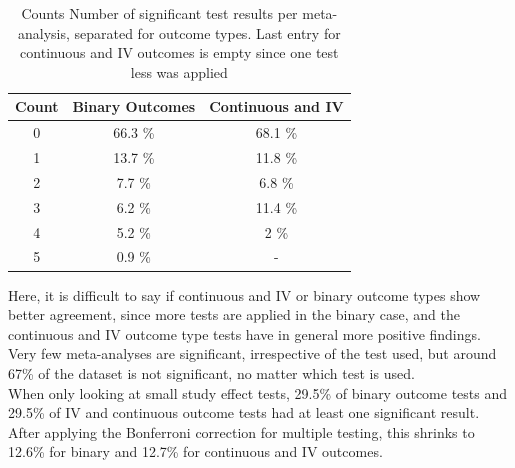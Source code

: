 \documentclass[11pt,a4paper,twoside]{book}\usepackage[]{graphicx}\usepackage[]{color}
\begin{document}
\begin{table}[ht]
\centering
\begingroup\footnotesize
\begin{tabular}{ccc}
  \hline
Count & Binary Outcomes & Continuous and IV \\ 
  \hline
0 & 66.3 \% & 68.1 \% \\ 
  1 & 13.7 \% & 11.8 \% \\ 
  2 & 7.7 \% & 6.8 \% \\ 
  3 & 6.2 \% & 11.4 \% \\ 
  4 & 5.2 \% & 2 \% \\ 
  5 & 0.9 \% & - \\ 
   \hline
\end{tabular}
\endgroup
\caption{Counts Number of significant test results per meta-analysis, separated
       for outcome types. Last entry for continuous and IV outcomes is empty since one test less was 
       applied} 
\label{number.sig.tests}
\end{table}


Here, it is difficult to say if continuous and IV or binary outcome types show better agreement, since more tests are applied in the binary case, and the continuous and IV outcome type tests have in general more positive findings. Very few meta-analyses are significant, irrespective of the test used, but around 67\% of the dataset is not significant, no matter which test is used. \\
When only looking at small study effect tests, 29.5\% of binary outcome tests and 29.5\% of IV and continuous outcome tests had at least one significant result. After applying the Bonferroni correction for multiple testing, this shrinks to 12.6\% for binary and 12.7\% for continuous and IV outcomes. \\
\end{document}
